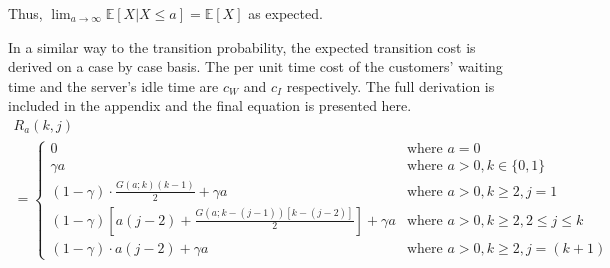Thus, $\displaystyle \lim_{a \to \infty} \mathbb{E} [X | X \leq a] = \mathbb{E} [X]$ as expected.

In a similar way to the transition probability, the expected transition cost is derived on a case by case basis. The per unit time cost of the customers' waiting time and the server's idle time are $c_{W}$ and $c_{I}$ respectively. The full derivation is included in the appendix and the final equation is presented here.
\begin{multline}
	R_{a} (k, j) \\
	= \begin{cases}
		0 & \text{where $a = 0$} \\
		\gamma a & \text{where $a > 0, k \in \{ 0, 1 \}$} \\
		(1 - \gamma) \cdot \frac{G (a; k) (k - 1)}{2} + \gamma a & \text{where $a > 0, k \geq 2, j = 1$} \\
		(1 - \gamma) \left[ a (j - 2) + \frac{G (a; k - (j - 1)) [k - (j - 2)]}{2} \right] + \gamma a & 	\text{where $a > 0, k \geq 2, 2 \leq j \leq k$} \\
		(1 - \gamma) \cdot a (j - 2) + \gamma a & \text{where $a > 0, k \geq 2, j = (k + 1)$}
	\end{cases}
\end{multline}




































